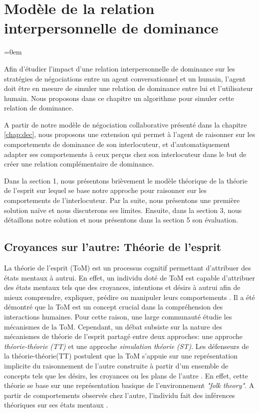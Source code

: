 \chapter[Relation interpersonnelle de dominance]{Modèle de la relation interpersonnelle de dominance}
\label{chap:Tom}
\begingroup
\parindent=0em
\localtableofcontents 
\clearpage
\endgroup

Afin d'étudier l'impact d'une relation interpersonnelle de dominance sur les stratégies de négociations entre un agent conversationnel et un humain, l'agent doit être en mesure de simuler une relation de dominance entre lui et l'utilisateur humain. Nous proposons dans ce chapitre un algorithme pour simuler cette relation de dominance. 

A partir de notre modèle de négociation collaborative présenté dans la chapitre \ref{chap:dec}, nous proposons une extension qui permet à l'agent de raisonner sur les comportements de dominance de son interlocuteur, et d'automatiquement adapter ses comportements à ceux perçus chez son interlocuteur dans le but de créer une relation complémentaire de dominance.

Dans la section 1, nous présentons brièvement le modèle théorique de la théorie de l'esprit sur lequel se base notre approche pour raisonner sur les comportements de l'interlocuteur. Par la suite, nous présentons une première solution naïve et nous discuterons ses limites. Ensuite, dans la section 3, nous détaillons notre solution et nous présentons dans la section 5 son évaluation.  




\section{Croyances sur l'autre: Théorie de l'esprit}
La théorie de l'esprit (ToM) est un processus cognitif permettant d'attribuer des états mentaux à autrui. En effet, un individu doté de ToM est capable d'attribuer
des états mentaux tels que des croyances, intentions et désirs à autrui afin de mieux comprendre, expliquer, prédire ou manipuler leurs comportements  \cite{harbers2012modeling}. Il a été démontré que la ToM est un concept crucial dans la compréhension des interactions humaines. Pour cette raison, une large communauté étudie les mécanismes de la ToM. Cependant, un débat subsiste sur la nature des mécanismes de théorie de l’esprit partagé entre deux approches: une approche \textit{théorie-théorie}  \emph{(TT)} et une approche \textit{simulation théorie} \emph{(ST)}.
Les défenseurs de la théorie-théorie(TT) postulent que la ToM s’appuie sur une représentation implicite du raisonnement de l'autre construite à partir d'un ensemble de concepts tels que les désirs, les croyances ou les plans de l'autre \cite{harbers2012modeling}. En effet, cette théorie se base sur une représentation basique de l'environnement \emph{"folk theory"}. A partir de comportements observés chez l'autre, l'individu fait des inférences théoriques sur ses états mentaux \cite{shanton2010simulation}.

